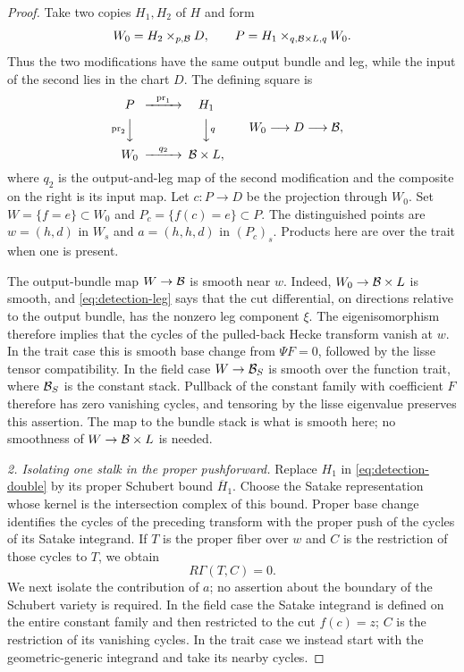 \begin{proof}
Take two copies $H_1,H_2$ of $H$ and form
\begin{equation}\label{eq:detection-double}
 W_0=H_2\times_{p,\mathcal B}D,
 \qquad
 P=H_1\times_{q,\mathcal B\times L,q}W_0.
\end{equation}
Thus the two modifications have the same output bundle and leg, while
the input of the second lies in the chart $D$.  The defining square is
\[
\begin{CD}
 P @>{\operatorname{pr}_1}>> H_1\\
 @V{\operatorname{pr}_2}VV @VV{q}V\\
 W_0 @>{q_2}>> \cB\times L,
\end{CD}
\qquad
 W_0\longrightarrow D\longrightarrow\cB,
\]
where $q_2$ is the output-and-leg map of the second modification and the
composite on the right is its input map.
Let $c:P\to D$ be the projection through $W_0$.  Set
$W=\{f=e\}\subset W_0$ and $P_c=\{f(c)=e\}\subset P$.
The distinguished points are $w=(h,d)$ in $W_s$ and
$a=(h,h,d)$ in $(P_c)_s$.  Products here are over the trait when one is
present.

The output-bundle map $W\to\mathcal B$ is smooth near $w$.  Indeed,
$W_0\to\mathcal B\times L$ is smooth, and
\eqref{eq:detection-leg} says that the cut differential, on directions
relative to the output bundle, has the nonzero leg component $\xi$.
The eigenisomorphism therefore implies that the cycles of the pulled-back
Hecke transform vanish at $w$.  In the trait case this is smooth base
change from $\Psi F=0$, followed by the lisse tensor compatibility.  In
the field case $W\to\mathcal B_S$ is smooth over the function trait, where
$\mathcal B_S$ is the constant stack.  Pullback of the constant family with
coefficient $F$ therefore has zero vanishing cycles, and tensoring by
the lisse eigenvalue preserves this assertion.  The map to the bundle
stack is what is smooth here; no smoothness of
$W\to\mathcal B\times L$ is needed.

\smallskip\noindent
\emph{2. Isolating one stalk in the proper pushforward.}
Replace $H_1$ in \eqref{eq:detection-double} by its proper Schubert bound
$\overline H_1$.  Choose the Satake representation whose kernel is the
intersection complex of this bound.  Proper base change identifies the
cycles of the preceding transform with the proper push of the cycles of
its Satake integrand.  If $T$ is the proper fiber over $w$ and $C$ is the
restriction of those cycles to $T$, we obtain
\begin{equation}\label{eq:detection-proper-zero}
                            R\Gamma(T,C)=0.
\end{equation}
We next isolate the contribution of $a$; no assertion about the boundary
of the Schubert variety is required.
In the field case the Satake integrand is defined on the entire constant
family and then restricted to the cut $f(c)=z$; $C$ is the restriction
of its vanishing cycles.  In the trait case we instead start with the
geometric-generic integrand and take its nearby cycles.


\end{proof}
